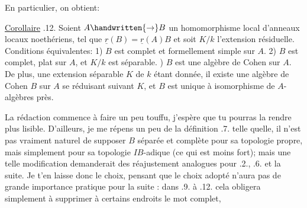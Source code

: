 
En particulier, on obtient:

\uline{Corollaire} .12. Soient $A\handwritten{\to}B$ un homomorphisme local d'anneaux locaux noethériens, tel que $\underline{r}(B)=\underline{r}(A)B$ et  soit $K/k$ l'extension résiduelle. Conditions équivalentes: 1) $B$ est complet et formellement simple sur $A$. 2) $B$ est complet, plat sur $A$, et $K/k$ est séparable. ) $B$ est une algèbre de Cohen sur $A$. De plus, une extension séparable $K$ de $k$ étant donnée, il existe une algèbre de Cohen $B$ sur $A$ se réduisant suivant $K$, et $B$ est unique à isomorphisme de $A$-algèbres près.

La rédaction commence à faire un peu touffu, j'espère que tu pourras la rendre plus lisible. D'ailleurs, je me répens un peu de la définition .7. telle quelle, il n'est pas vraiment naturel de supposer $B$ séparée et complète pour sa topologie propre, mais simplement pour sa topologie $IB$-adique (ce qui est moins fort); mais une telle modification demanderait des réajustement analogues pour .2., .6. et la suite. Je t'en laisse donc le choix, pensant que le choix adopté n'aura pas de grande importance pratique pour la suite : dans .9. à .12. cela obligera simplement à supprimer à certains endroits le mot \textquotedbl{}complet\textquotedbl{}, 

